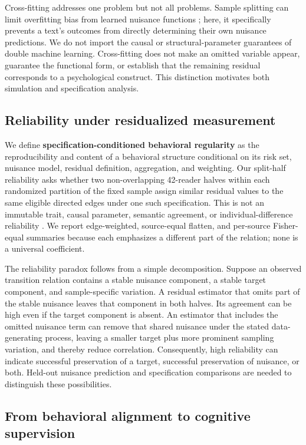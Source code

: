 \documentclass[11pt]{article}
\begin{document}
Cross-fitting addresses one problem but not all problems. Sample splitting can limit overfitting bias from learned nuisance functions \citep{chernozhukov2018}; here, it specifically prevents a text's outcomes from directly determining their own nuisance predictions. We do not import the causal or structural-parameter guarantees of double machine learning. Cross-fitting does not make an omitted variable appear, guarantee the functional form, or establish that the remaining residual corresponds to a psychological construct. This distinction motivates both simulation and specification analysis.

\subsection{Reliability under residualized measurement}

We define \textbf{specification-conditioned behavioral regularity} as the reproducibility and content of a behavioral structure conditional on its risk set, nuisance model, residual definition, aggregation, and weighting. Our split-half reliability asks whether two non-overlapping 42-reader halves within each randomized partition of the fixed sample assign similar residual values to the same eligible directed edges under one such specification. This is not an immutable trait, causal parameter, semantic agreement, or individual-difference reliability \citep{hedge2018,rouder2019}. We report edge-weighted, source-equal flatten, and per-source Fisher-equal summaries because each emphasizes a different part of the relation; none is a universal coefficient.

The reliability paradox follows from a simple decomposition. Suppose an observed transition relation contains a stable nuisance component, a stable target component, and sample-specific variation. A residual estimator that omits part of the stable nuisance leaves that component in both halves. Its agreement can be high even if the target component is absent. An estimator that includes the omitted nuisance term can remove that shared nuisance under the stated data-generating process, leaving a smaller target plus more prominent sampling variation, and thereby reduce correlation. Consequently, high reliability can indicate successful preservation of a target, successful preservation of nuisance, or both. Held-out nuisance prediction and specification comparisons are needed to distinguish these possibilities.

\subsection{From behavioral alignment to cognitive supervision}
\end{document}
